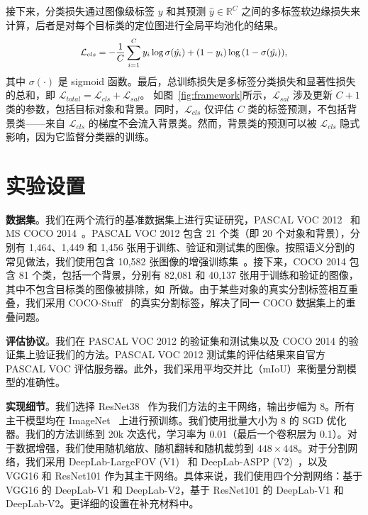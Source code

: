 \documentclass[final]{cvpr}
\begin{document}
接下来，分类损失通过图像级标签 $y$ 和其预测 $\hat{y} \in \mathbb{R}^C$ 之间的多标签软边缘损失来计算，后者是对每个目标类的定位图进行全局平均池化的结果。\vspace{-1mm}
\begin{equation}
{\small
\begin{split}
\label{loss_cls}
\mathcal{L}_{cls}= - \frac{1}{C} \sum_{i=1}^{C} y_i \log{\sigma(\hat{y_i})} + (1-y_i) \log{(1 - \sigma(\hat{y_i}))},
\end{split}}\vspace{-1mm}
\end{equation}
\noindent 其中 $\sigma(\cdot)$ 是 sigmoid 函数。最后，总训练损失是多标签分类损失和显著性损失的总和，即 $\mathcal{L}_{total} = \mathcal{L}_{cls} + \mathcal{L}_{sal}$。
如图~\ref{fig:framework}所示，$\mathcal{L}_{sal}$ 涉及更新 $C+1$ 类的参数，包括目标对象和背景。同时，$\mathcal{L}_{cls}$ 仅评估 $C$ 类的标签预测，不包括背景类——来自 $\mathcal{L}_{cls}$ 的梯度不会流入背景类。然而，背景类的预测可以被 $\mathcal{L}_{cls}$ 隐式影响，因为它监督分类器的训练。

\section{实验设置}
\noindent
\textbf{数据集}。我们在两个流行的基准数据集上进行实证研究，PASCAL VOC 2012~\cite{everingham2015pascal} 和 MS COCO 2014~\cite{lin2014microsoft}。PASCAL VOC 2012 包含 21 个类（即 20 个对象和背景），分别有 1,464、1,449 和 1,456 张用于训练、验证和测试集的图像。按照语义分割的常见做法，我们使用包含 10,582 张图像的增强训练集~\cite{hariharan2011semantic}。接下来，COCO 2014 包含 81 个类，包括一个背景，分别有 82,081 和 40,137 张用于训练和验证的图像，其中不包含目标类的图像被排除，如~\cite{choe2020attention}所做。由于某些对象的真实分割标签相互重叠，我们采用 COCO-Stuff~\cite{caesar2018coco} 的真实分割标签，解决了同一 COCO 数据集上的重叠问题。

\vspace{0.5mm}
\noindent
\textbf{评估协议}。我们在 PASCAL VOC 2012 的验证集和测试集以及 COCO 2014 的验证集上验证我们的方法。PASCAL VOC 2012 测试集的评估结果来自官方 PASCAL VOC 评估服务器。此外，我们采用平均交并比（mIoU）来衡量分割模型的准确性。

\vspace{0.5mm}
\noindent
\textbf{实现细节}。我们选择 ResNet38~\cite{wu2019wider} 作为我们方法的主干网络，输出步幅为 8。所有主干模型均在 ImageNet~\cite{deng2009imagenet} 上进行预训练。我们使用批量大小为 8 的 SGD 优化器。我们的方法训练到 20k 次迭代，学习率为 0.01（最后一个卷积层为 0.1）。对于数据增强，我们使用随机缩放、随机翻转和随机裁剪到 $448 \times 448$。对于分割网络，我们采用 DeepLab-LargeFOV (V1)~\cite{chen2014semantic} 和 DeepLab-ASPP (V2)~\cite{chen2017deeplab}，以及 VGG16 和 ResNet101 作为其主干网络。具体来说，我们使用四个分割网络：基于 VGG16 的 DeepLab-V1 和 DeepLab-V2，基于 ResNet101 的 DeepLab-V1 和 DeepLab-V2。更详细的设置在补充材料中。
\end{document}
